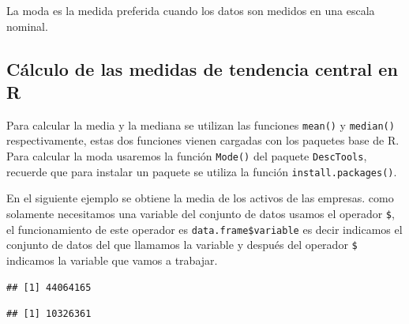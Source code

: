 \documentclass[]{book}
\newenvironment{Shaded}{\begin{snugshade}}{\end{snugshade}}
\newcommand{\KeywordTok}[1]{\textcolor[rgb]{0.13,0.29,0.53}{\textbf{#1}}}
\newcommand{\OperatorTok}[1]{\textcolor[rgb]{0.81,0.36,0.00}{\textbf{#1}}}
\newcommand{\NormalTok}[1]{#1}
\begin{document}
La moda es la medida preferida cuando los datos son medidos en una
escala nominal.

\subsection{Cálculo de las medidas de tendencia central en
R}\label{calculo-de-las-medidas-de-tendencia-central-en-r}

Para calcular la media y la mediana se utilizan las funciones
\texttt{mean()} y \texttt{median()} respectivamente, estas dos funciones
vienen cargadas con los paquetes base de R. Para calcular la moda
usaremos la función \texttt{Mode()} del paquete \texttt{DescTools},
recuerde que para instalar un paquete se utiliza la función
\texttt{install.packages()}.

En el siguiente ejemplo se obtiene la media de los activos de las
empresas. como solamente necesitamos una variable del conjunto de datos
usamos el operador \texttt{\$}, el funcionamiento de este operador es
\texttt{data.frame\$variable} es decir indicamos el conjunto de datos
del que llamamos la variable y después del operador \texttt{\$}
indicamos la variable que vamos a trabajar.

\begin{Shaded}
\end{Shaded}

\begin{verbatim}
## [1] 44064165
\end{verbatim}

\begin{Shaded}
\end{Shaded}

\begin{verbatim}
## [1] 10326361
\end{verbatim}

\begin{Shaded}
\end{Shaded}
\end{document}
